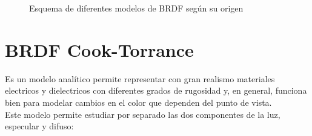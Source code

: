 
    \begin{figure}[H]
        \centering
        \caption{Esquema de diferentes modelos de BRDF seg\'un su origen}
        \vspace{0.5cm}
    \end{figure}

    \section{BRDF Cook-Torrance}
    Es un modelo anal\'itico permite representar con gran realismo materiales electricos y dielectricos con diferentes
    grados de rugosidad y, en general, funciona bien para modelar cambios en el color que dependen del punto de vista.\\
    Este modelo permite estudiar por separado las dos componentes de la luz, especular y difuso:
    
